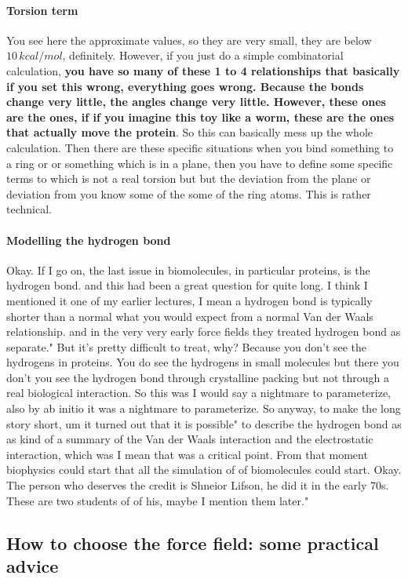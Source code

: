 \paragraph{Torsion term}
You see here the approximate values, so they are very small, they are below $10 \, kcal/mol$, definitely. However, if you just do a simple combinatorial calculation, \textbf{you have so many of these 1 to 4 relationships that basically if you set this wrong, everything goes wrong. Because the bonds change very little, the angles change very little. However, these ones are the ones, if if you imagine this toy like a worm, these are the ones that actually move the protein}.
So this can basically mess up the whole calculation. 
Then there are these specific situations when you bind something to a ring or or something which is in a plane, then you have to define some specific terms to which is not a real torsion but but the deviation from the plane or deviation from you know some of the some of the ring atoms. This is rather technical. 

\paragraph{Modelling the hydrogen bond}
Okay. If I go on, the last issue in biomolecules, in particular proteins, is the hydrogen bond. and this had been a great question for quite long. I think I mentioned it one of my earlier lectures, I mean a hydrogen bond is typically shorter than a normal what you would expect from a normal Van der Waals relationship. and in the very very early force fields they treated hydrogen bond as separate."
But it's pretty difficult to treat, why? Because you don't see the hydrogens in proteins. You do see the hydrogens in small molecules but there you don't you see the hydrogen bond through crystalline packing but not through a real biological interaction. So this was I would say a nightmare to parameterize, also by ab initio it was a nightmare to parameterize. So anyway, to make the long story short, um it turned out that it is possible"
to describe the hydrogen bond as as kind of a summary of the Van der Waals interaction and the electrostatic interaction, which was I mean that was a critical point. From that moment biophysics could start that all the simulation of of biomolecules could start. Okay. The person who deserves the credit is Shneior Lifson, he did it in the early 70s. These are two students of of his, maybe I mention them later."


\subsection{How to choose the force field: some practical advice}

